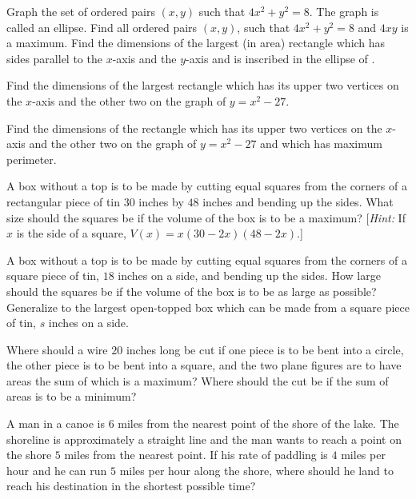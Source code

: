 \begin{exercises}
\begin{exenum}
\sx
{}
Graph the set of ordered pairs $(x,y)$ such that
$4x^2 + y^2 = 8$.  The graph is called an ellipse.
\sx
Find all ordered pairs $(x,y)$, such that $4x^2 + y^2 = 8$
and $4xy$ is a maximum.
\sx
Find the dimensions of the largest (in area) rectangle which
has sides parallel to the $x$-axis and the $y$-axis and is
inscribed in the ellipse of .
\end{exenum}

Find the dimensions of the largest rectangle which has its upper
two vertices on the $x$-axis and the other two on the graph of
$y = x^2 - 27$.

Find the dimensions of the rectangle which has its upper two vertices
on the $x$-axis and the other two on the graph of $y = x^2 - 27$
and which has maximum perimeter.

A box without a top is to be made by cutting equal squares from the
corners of a rectangular piece of tin $30$ inches by $48$ inches and
bending up the sides.  What size should the squares be if the volume
of the box is to be a maximum?  [\emph{Hint:} If $x$ is the side
of a square, $V(x) = x(30-2x)(48-2x)$.]

\begin{exenum}
\sx
{}
A box without a top is to be made by cutting equal squares from
the corners of a square piece of tin, $18$ inches on a side,
and bending up the sides.  How large should the squares be
if the volume of the box is to be as large as possible?
\sx
Generalize  to the largest open-topped box which
can be made from a square piece of tin, $s$ inches on a side.
\end{exenum}

\begin{exenum}
\sx
Where should a wire $20$ inches long be cut if one piece is to be
bent into a circle, the other piece is to be bent into a square,
and the two plane figures are to have areas the sum of which
is a maximum?
\sx
Where should the cut be if the sum of areas is to be a minimum?
\end{exenum}

A man in a canoe is $6$ miles from the nearest point of the shore
of the lake.  The shoreline is approximately a straight line and the man wants
to reach a point on the shore $5$ miles from the nearest point.
If his rate of paddling is $4$ miles per hour and he can run $5$
miles per hour along the shore, where should he land to reach his
destination in the shortest possible time?


\end{exercises}
